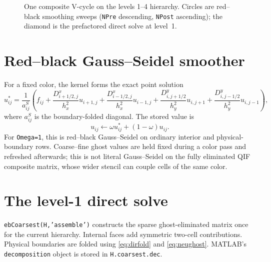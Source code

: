 \documentclass[11pt,oneside,openany]{book}
\newcommand{\code}[1]{\textnormal{\texttt{#1}}}
\begin{document}
\begin{figure}[htbp]
\centering
{}
\caption{One composite V-cycle on the levels 1--4 hierarchy. Circles are red--black smoothing sweeps (\code{NPre} descending, \code{NPost} ascending); the diamond is the prefactored direct solve at level~1.}
\label{fig:vschedule}
\end{figure}

\section{Red--black Gauss--Seidel smoother}
For a fixed color, the kernel forms the exact point solution
\begin{equation}
 u_{ij}^{*}=\frac{1}{a_{ij}^{S}}
 \left(
 f_{ij}
 +\frac{D^x_{i+1/2,j}}{h_x^2}u_{i+1,j}
 +\frac{D^x_{i-1/2,j}}{h_x^2}u_{i-1,j}
 +\frac{D^y_{i,j+1/2}}{h_y^2}u_{i,j+1}
 +\frac{D^y_{i,j-1/2}}{h_y^2}u_{i,j-1}
 \right),
 \label{eq:gsupdate}
\end{equation}
where $a_{ij}^{S}$ is the boundary-folded diagonal. The stored value is
\[
 u_{ij}\leftarrow\omega u_{ij}^{*}+(1-\omega)u_{ij}.
\]
For \code{Omega=1}, this is red--black Gauss--Seidel on ordinary interior and physical-boundary rows. Coarse--fine ghost values are held fixed during a color pass and refreshed afterwards; this is not literal Gauss--Seidel on the fully eliminated QIF composite matrix, whose wider stencil can couple cells of the same color.

\section{The level-1 direct solve}
\code{ebCoarsest(H,'assemble')} constructs the sparse ghost-eliminated matrix once for the current hierarchy. Internal faces add symmetric two-cell contributions. Physical boundaries are folded using \cref{eq:dirfold} and \cref{eq:neughost}. MATLAB's \code{decomposition} object is stored in \code{H.coarsest.dec}.
\end{document}
